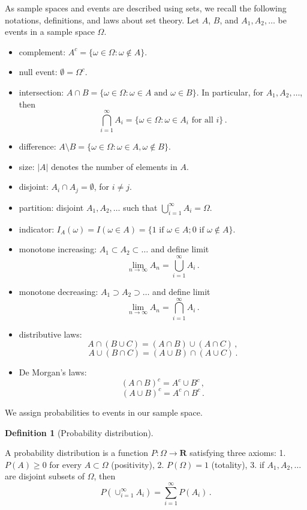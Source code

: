 \documentclass[
  a4paper,
  oneside]{book}
\theoremstyle{definition}
\newtheorem{definition}{Definition}[chapter]
\theoremstyle{definition}
\theoremstyle{definition}
\theoremstyle{plain}
\theoremstyle{remark}
\begin{document}
As sample spaces and events are described using sets, we recall the
following notations, definitions, and laws about set theory. Let \(A\),
\(B\), and \(A_1, A_2, \dots\) be events in a sample space \(\Omega\).

\begin{itemize}
\item
  complement: \(A^c = \{ \omega \in \Omega: \omega \notin A\}\).
\item
  null event: \(\emptyset = \Omega^c\).
\item
  intersection:
  \(A \cap B = \{\omega \in \Omega : \omega \in A \text{ and } \omega \in B\}\).
  In particular, for \(A_1, A_2, \dots\), then
  \[\bigcap_{i=1}^\infty A_i = \{\omega \in \Omega : \omega \in A_i \text{ for all } i \}\,.\]
\item
  difference:
  \(A \setminus B = \{\omega \in \Omega : \omega \in A, \omega \notin B\}\).
\item
  size: \(|A|\) denotes the number of elements in \(A\).
\item
  disjoint: \(A_i \cap A_j = \emptyset\), for \(i\neq j\).
\item
  partition: disjoint \(A_1, A_2, \dots\) such that
  \(\bigcup_{i=1}^\infty A_i = \Omega\).
\item
  indicator:
  \(I_A(\omega) = I(\omega \in A) = \{1 \text{ if } \omega \in A; 0 \text{ if } \omega \notin A\}\).
\item
  monotone increasing: \(A_1 \subset A_2 \subset \dots\) and define
  limit \[\lim_{n \to \infty}A_n = \bigcup_{i=1}^\infty A_i\,.\]
\item
  monotone decreasing: \(A_1 \supset A_2 \supset \dots\) and define
  limit \[\lim_{n \to \infty} A_n = \bigcap_{i=1}^\infty A_i\,.\]
\item
  distributive laws: \[A\cap (B\cup C) = (A\cap B) \cup (A \cap C)\,,\]
  \[A\cup(B\cap C) = (A \cup B) \cap (A\cup C)\,.\]
\item
  De Morgan's laws: \[(A \cap B)^c = A^c \cup B^c\,,\]
  \[(A\cup B)^c = A^c \cap B^c\,.\]
\end{itemize}

We assign probabilities to events in our sample space.

\begin{definition}[Probability
distribution]\protect\hypertarget{def-prob}{}\label{def-prob}

A probability distribution is a function \(P : \Omega \to \mathbf{R}\)
satisfying three axioms: 1. \(P(A) \geq 0\) for every
\(A \subset \Omega\) (positivity), 2. \(P(\Omega) = 1\) (totality), 3.
if \(A_1, A_2, \dots\) are disjoint subsets of \(\Omega\), then
\[P(\cup_{i=1}^\infty A_i) = \sum_{i=1}^\infty P(A_i)\,.\]

\end{definition}
\end{document}

